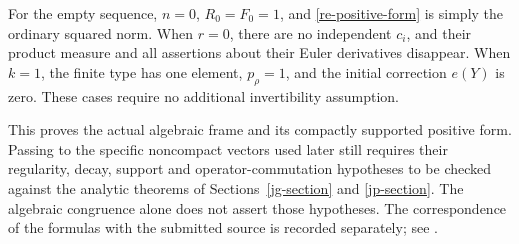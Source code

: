 For the empty sequence, \(n=0\), \(R_0=F_0=1\), and
\eqref{re-positive-form} is simply the ordinary squared norm.
When \(r=0\), there are no independent \(c_i\), and their
product measure and all assertions about their Euler
derivatives disappear.  When \(k=1\), the finite type has
one element, \(p_\rho=1\), and the initial correction
\(e(Y)\) is zero.  These cases require no additional
invertibility assumption.

This proves the actual algebraic frame and its compactly
supported positive form.  Passing to the specific noncompact
vectors used later still requires their regularity, decay,
support and operator-commutation hypotheses to be checked
against the analytic theorems of
Sections~\ref{jg-section} and \ref{jp-section}.
The algebraic congruence alone does not assert those hypotheses.
The correspondence of the formulas with the submitted source
is recorded separately; see \cite{alpo-uniform-source}.


